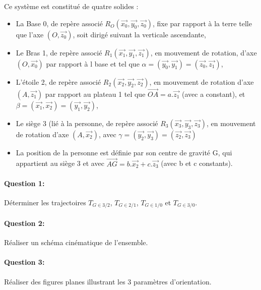 Ce système est constitué de quatre solides :
\begin{itemize}
 \item  La Base 0, de repère associé $R_O(\overrightarrow{x_0},\overrightarrow{y_0},\overrightarrow{z_0})$, fixe par rapport à la terre telle que l'axe $(O, \overrightarrow{z_0})$, soit dirigé suivant la verticale ascendante,
 \item Le Bras 1, de repère associé $R_1(\overrightarrow{x_1},\overrightarrow{y_1},\overrightarrow{z_1})$, en mouvement de rotation, d'axe $(O, \overrightarrow{x_0})$ par rapport à l base et tel que $\alpha=(\overrightarrow{y_0},\overrightarrow{y_1})=(\overrightarrow{z_0},\overrightarrow{z_1})$,
 \item L'étoile 2, de repère associé $R_2(\overrightarrow{x_2},\overrightarrow{y_2},\overrightarrow{z_2})$, en mouvement de rotation d'axe $(A, \overrightarrow{z_1})$ par rapport au plateau 1 tel que $\overrightarrow{OA}=a.\overrightarrow{z_1}$ (avec a constant), et $\beta=(\overrightarrow{x_1},\overrightarrow{x_2})=(\overrightarrow{y_1},\overrightarrow{y_2})$,
 \item Le siège 3 (lié à la personne, de repère associé $R_3(\overrightarrow{x_3},\overrightarrow{y_3},\overrightarrow{z_3})$, en mouvement de rotation d'axe $(A, \overrightarrow{x_2})$, avec $\gamma=(\overrightarrow{y_2},\overrightarrow{y_3})=(\overrightarrow{z_2},\overrightarrow{z_3})$
 \item La position de la personne est définie par son centre de gravité G, qui appartient au siège 3 et avec $\overrightarrow{AG}=b.\overrightarrow{x_2}+c.\overrightarrow{z_3}$ (avec b et c constants).
\end{itemize}

\paragraph{Question 1:} Déterminer les trajectoires $T_{G \in 3/2}$, $T_{G \in 2/1}$, $T_{G \in 1/0}$ et $T_{G \in 3/0}$.

\paragraph{Question 2:} Réaliser un schéma cinématique de l'ensemble.

\paragraph{Question 3:} Réaliser des figures planes illustrant les 3 paramètres d'orientation.


